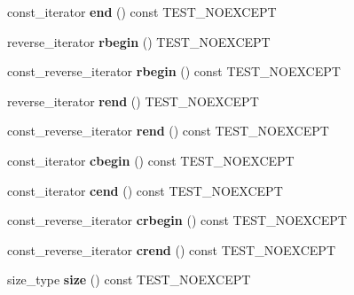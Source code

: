 \begin{DoxyCompactItemize}
const\+\_\+iterator {\bfseries end} () const T\+E\+S\+T\+\_\+\+N\+O\+E\+X\+C\+E\+PT
\item 
\mbox{\label{classnasty__vector_af443c91dc97ea95c44402bbfc4a8d8ee}} 
reverse\+\_\+iterator {\bfseries rbegin} () T\+E\+S\+T\+\_\+\+N\+O\+E\+X\+C\+E\+PT
\item 
\mbox{\label{classnasty__vector_aea9568f02050a9a2137eb1c9a24126a0}} 
const\+\_\+reverse\+\_\+iterator {\bfseries rbegin} () const T\+E\+S\+T\+\_\+\+N\+O\+E\+X\+C\+E\+PT
\item 
\mbox{\label{classnasty__vector_af52482016e722548a96a8c5c098a8662}} 
reverse\+\_\+iterator {\bfseries rend} () T\+E\+S\+T\+\_\+\+N\+O\+E\+X\+C\+E\+PT
\item 
\mbox{\label{classnasty__vector_a05873d82e3cc2ea826cad532c1452df6}} 
const\+\_\+reverse\+\_\+iterator {\bfseries rend} () const T\+E\+S\+T\+\_\+\+N\+O\+E\+X\+C\+E\+PT
\item 
\mbox{\label{classnasty__vector_a541d818155da81e35cbc8a869c4e0671}} 
const\+\_\+iterator {\bfseries cbegin} () const T\+E\+S\+T\+\_\+\+N\+O\+E\+X\+C\+E\+PT
\item 
\mbox{\label{classnasty__vector_ae223f7623a3b8ffd9ff4c079861b59fd}} 
const\+\_\+iterator {\bfseries cend} () const T\+E\+S\+T\+\_\+\+N\+O\+E\+X\+C\+E\+PT
\item 
\mbox{\label{classnasty__vector_a1b02cbbe693ed304d957ec07f0b2f583}} 
const\+\_\+reverse\+\_\+iterator {\bfseries crbegin} () const T\+E\+S\+T\+\_\+\+N\+O\+E\+X\+C\+E\+PT
\item 
\mbox{\label{classnasty__vector_aae9e466ffec8594fd77ca8629624c9e2}} 
const\+\_\+reverse\+\_\+iterator {\bfseries crend} () const T\+E\+S\+T\+\_\+\+N\+O\+E\+X\+C\+E\+PT
\item 
\mbox{\label{classnasty__vector_a2cd77153abf9fe4d31800a727caed187}} 
size\+\_\+type {\bfseries size} () const T\+E\+S\+T\+\_\+\+N\+O\+E\+X\+C\+E\+PT
\item 
\mbox{\label{classnasty__vector_afe004a6fc9f6ab4d7015ff67c86817c9}} 

\end{DoxyCompactItemize}

